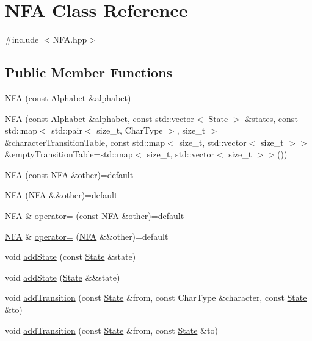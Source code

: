 \hypertarget{classNFA}{}\section{N\+FA Class Reference}
\label{classNFA}


{\ttfamily \#include $<$N\+F\+A.\+hpp$>$}

\subsection*{Public Member Functions}
\begin{DoxyCompactItemize}
\item 
\hyperlink{classNFA_ae8841f4b0dbe122187e2a64c73643769}{N\+FA} (const Alphabet \&alphabet)
\item 
\hyperlink{classNFA_ae7fe25f259e31506f1358608f44b3d24}{N\+FA} (const Alphabet \&alphabet, const std\+::vector$<$ \hyperlink{structState}{State} $>$ \&states, const std\+::map$<$ std\+::pair$<$ size\+\_\+t, Char\+Type $>$, size\+\_\+t $>$ \&character\+Transition\+Table, const std\+::map$<$ size\+\_\+t, std\+::vector$<$ size\+\_\+t $>$$>$ \&empty\+Transition\+Table=std\+::map$<$ size\+\_\+t, std\+::vector$<$ size\+\_\+t $>$$>$())
\item 
\hyperlink{classNFA_ae7303013f54a9f08704ae9b805c38650}{N\+FA} (const \hyperlink{classNFA}{N\+FA} \&other)=default
\item 
\hyperlink{classNFA_a4d1844d6d9d20506be1d80dd6e81d011}{N\+FA} (\hyperlink{classNFA}{N\+FA} \&\&other)=default
\item 
\hyperlink{classNFA}{N\+FA} \& \hyperlink{classNFA_afad27066b284b7bf217df99a415d292d}{operator=} (const \hyperlink{classNFA}{N\+FA} \&other)=default
\item 
\hyperlink{classNFA}{N\+FA} \& \hyperlink{classNFA_aa8a9cfe181878d1ee0279feeab1d46c5}{operator=} (\hyperlink{classNFA}{N\+FA} \&\&other)=default
\item 
void \hyperlink{classNFA_a12aa5a3267473c67ad7c75f9d13f2157}{add\+State} (const \hyperlink{structState}{State} \&state)
\item 
void \hyperlink{classNFA_a01d23e3617878eede7d7e162fa29a990}{add\+State} (\hyperlink{structState}{State} \&\&state)
\item 
void \hyperlink{classNFA_aa1be789eb438068c1297f81cebde3986}{add\+Transition} (const \hyperlink{structState}{State} \&from, const Char\+Type \&character, const \hyperlink{structState}{State} \&to)
\item 
void \hyperlink{classNFA_a8a806166448f5228f1cea02fb3c407e1}{add\+Transition} (const \hyperlink{structState}{State} \&from, const \hyperlink{structState}{State} \&to)

\end{DoxyCompactItemize}
